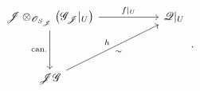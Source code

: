 \[
\begin{tikzcd}[column sep=5.4em, row sep=3.5em]
 \mathscr J\otimes_{\mathscr O_{S_{\mathscr J}}}
   \bigl(\mathscr G_{\mathscr J}|_U\bigr)
   \arrow[r,"f|_U"]
   \arrow[d,"\mathrm{can.}"']
 &
 \mathscr Q|_U
 \\
 \mathscr J\mathscr G
   \arrow[ur,"h","{\sim}"']
 &
\end{tikzcd}
\, .
\]
